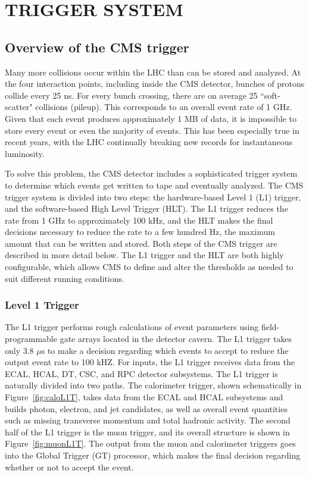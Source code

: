 \chapter{TRIGGER SYSTEM}
\label{chap:Trigger}

\section{Overview of the CMS trigger}
\label{sec:trigOverview}
Many more collisions occur within the LHC than can be stored and analyzed. At the four interaction points, including inside the CMS detector, bunches of protons collide every 25 ns. For every bunch crossing, there are on average 25 ``soft-scatter" collisions (pileup). This corresponds to an overall event rate of 1 GHz. Given that each event produces approximately 1 MB of data, it is impossible to store every event or even the majority of events. This has been especially true in recent years, with the LHC continually breaking new records for instantaneous luminosity. 

To solve this problem, the CMS detector includes a sophisticated trigger system to determine which events get written to tape and eventually analyzed. The CMS trigger system is divided into two steps: the hardware-based Level 1 (L1) trigger, and the software-based High Level Trigger (HLT). The L1 trigger reduces the rate from 1 GHz to approximately 100 kHz, and the HLT makes the final decisions necessary to reduce the rate to a few hundred Hz, the maximum amount that can be written and stored. Both steps of the CMS trigger are described in more detail below. The L1 trigger and the HLT are both highly configurable, which allows CMS to define and alter the thresholds as needed to suit different running conditions.


\subsection{Level 1 Trigger}
\label{sec:L1}
The L1 trigger performs rough calculations of event parameters using field-programmable gate arrays located in the detector cavern. The L1 trigger takes only 3.8 $\mu$s to make a decision regarding which events to accept to reduce the output event rate to 100 kHZ. For inputs, the L1 trigger receives data from the ECAL, HCAL, DT, CSC, and RPC detector subsystems. The L1 trigger is naturally divided into two paths. The calorimeter trigger, shown schematically in Figure~\ref{fig:caloL1T}, takes data from the ECAL and HCAL subsystems and builds photon, electron, and jet candidates, as well as overall event quantities such as missing transverse momentum and total hadronic activity. The second half of the L1 trigger is the muon trigger, and its overall structure is shown in Figure~\ref{fig:muonL1T}. The output from the muon and calorimeter triggers goes into the Global Trigger (GT) processor, which makes the final decision regarding whether or not to accept the event. 


